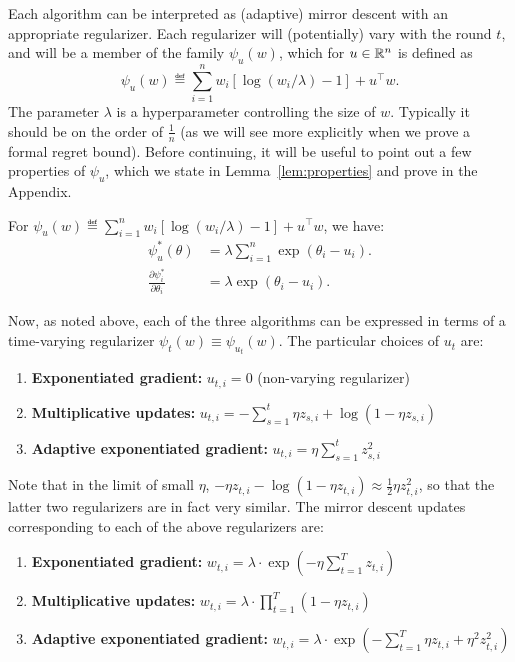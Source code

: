 \documentclass[11pt]{article}
\begin{document}
Each algorithm can be interpreted as (adaptive) mirror descent with an appropriate 
regularizer. Each regularizer will (potentially) vary with the round $t$, and will be a 
member of the family $\psi_u(w)$, which for $u \in \mathbb{R}^n$ is defined as
\[ \psi_u(w) \eqdef \sum_{i=1}^n w_i[\log(w_i/\lambda)-1] + u^{\top}w. \]
The parameter $\lambda$ is a hyperparameter controlling the size of $w$. Typically it should be on the order of $\frac{1}{n}$ 
(as we will see more explicitly when we prove a formal regret bound). 
Before continuing, it will be useful to point out a few properties of $\psi_u$, which we 
state in Lemma~\ref{lem:properties} and prove in the Appendix.
\begin{lemma}
\label{lem:properties}
For $\psi_u(w) \eqdef \sum_{i=1}^n w_i[\log(w_i/\lambda)-1] + u^{\top}w$, we have:
\begin{align}
\psi_u^*(\theta) &= \lambda \sum_{i=1}^n \exp(\theta_i - u_i). \\
\frac{\partial \psi_i^*}{\partial \theta_i} &= \lambda \exp(\theta_i - u_i). 
\end{align}
\end{lemma}
Now, as noted above, each of the three algorithms can be expressed in terms of a 
time-varying regularizer $\psi_t(w) \equiv \psi_{u_t}(w)$. The particular choices of $u_t$ are:
\begin{enumerate}
        \item \textbf{Exponentiated gradient:} $u_{t,i} = 0$ (non-varying regularizer) %
        \item \textbf{Multiplicative updates:} $u_{t,i} = -\sum_{s=1}^t \eta z_{s,i} + \log(1-\eta z_{s,i})$ %
        \item \textbf{Adaptive exponentiated gradient:} $u_{t,i} = \eta \sum_{s=1}^t z_{s,i}^2$ %
\end{enumerate}
Note that in the limit of small $\eta$, 
$-\eta z_{t,i} - \log(1-\eta z_{t,i}) \approx \frac{1}{2}\eta z_{t,i}^2$, so that 
the latter two regularizers are in fact very similar. The mirror descent updates corresponding 
to each of the above regularizers are:
\begin{enumerate}
        \item \textbf{Exponentiated gradient:} $w_{t,i} = \lambda \cdot \exp\left(-\eta \sum_{t=1}^T z_{t,i}\right)$
        \item \textbf{Multiplicative updates:} $w_{t,i} = \lambda \cdot \prod_{t=1}^T (1- \eta z_{t,i})$
        \item \textbf{Adaptive exponentiated gradient:} $w_{t,i} = \lambda \cdot \exp\left(- \sum_{t=1}^T \eta z_{t,i} + \eta^2 z_{t,i}^2\right)$
\end{enumerate}
\end{document}
